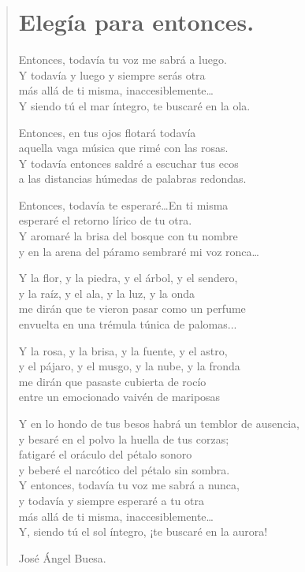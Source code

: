 \documentclass[11pt, portrait, twoside, notitlepage, openright]{book}
\begin{document}
\newpage
\begin{verse}
\begin{center}
\section{Elegía para entonces.}
\end{center}
Entonces, todavía tu voz me sabrá a luego.\\
Y todavía y luego y siempre serás otra\\
más allá de ti misma, inaccesiblemente…\\
Y siendo tú el mar íntegro, te buscaré en la ola.
\newline

Entonces, en tus ojos flotará todavía\\
aquella vaga música que rimé con las rosas.\\
Y todavía entonces saldré a escuchar tus ecos\\
a las distancias húmedas de palabras redondas.
\newline

Entonces, todavía te esperaré…En ti misma\\
esperaré el retorno lírico de tu otra.\\
Y aromaré la brisa del bosque con tu nombre\\
y en la arena del páramo sembraré mi voz ronca…
\newline

Y la flor, y la piedra, y el árbol, y el sendero,\\
y la raíz, y el ala, y la luz, y la onda\\
me dirán que te vieron pasar como un perfume\\
envuelta en una trémula túnica de palomas...
\newpage

Y la rosa, y la brisa, y la fuente, y el astro,\\
y el pájaro, y el musgo, y la nube, y la fronda\\
me dirán que pasaste cubierta de rocío\\
entre un emocionado vaivén de mariposas
\newline

Y en lo hondo de tus besos habrá un temblor de ausencia,\\
y besaré en el polvo la huella de tus corzas;\\
fatigaré el oráculo del pétalo sonoro\\
y beberé el narcótico del pétalo sin sombra.\\
Y entonces, todavía tu voz me sabrá a nunca,\\
y todavía y siempre esperaré a tu otra\\
más allá de ti misma, inaccesiblemente…\\
Y, siendo tú el sol íntegro, ¡te buscaré en la aurora!
\newline

José Ángel Buesa.
\end{verse}
\end{document}
